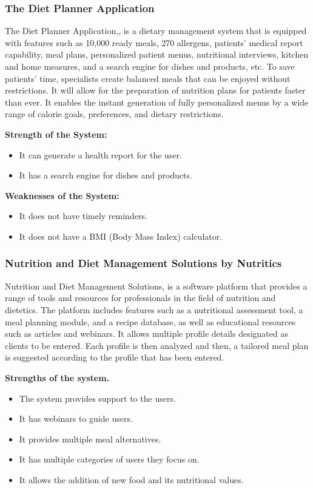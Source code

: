 \documentclass{article}
\begin{document}
\subsubsection{The Diet Planner Application}

The Diet Planner Application,\cite{dietplannerapp}, is a dietary management system that is equipped with features such as 10,000 ready meals, 270 allergens, patients' medical report capability, meal plans, personalized patient menus, nutritional interviews, kitchen and home measures, and a search engine for dishes and products, etc. To save patients' time, specialists create balanced meals that can be enjoyed without restrictions. It will allow for the preparation of nutrition plans for patients faster than ever. It enables the instant generation of fully personalized menus by a wide range of calorie goals, preferences, and dietary restrictions.

\textbf{Strength of the System:}
\begin{itemize}
\item It can generate a health report for the user.
\item It has a search engine for dishes and products.
\end{itemize}

\textbf{Weaknesses of the System:}
\begin{itemize}
\item It does not have timely reminders.
\item It does not have a BMI (Body Mass Index) calculator.
\end{itemize}

\subsubsection{Nutrition and Diet Management Solutions by Nutritics}

Nutrition and Diet Management Solutions,\cite{nutritics} is a software platform that provides a range of tools and resources for professionals in the field of nutrition and dietetics. The platform includes features such as a nutritional assessment tool, a meal planning module, and a recipe database, as well as educational resources such as articles and webinars. It allows multiple profile details designated as clients to be entered. Each profile is then analyzed and then, a tailored meal plan is suggested according to the profile that has been entered.

\textbf{Strengths of the system.}
\begin{itemize}
\item The system provides support to the users.
\item It has webinars to guide users.
\item It provides multiple meal alternatives.
\item It has multiple categories of users they focus on.
\item It allows the addition of new food and its nutritional values.
\end{itemize}
\end{document}
